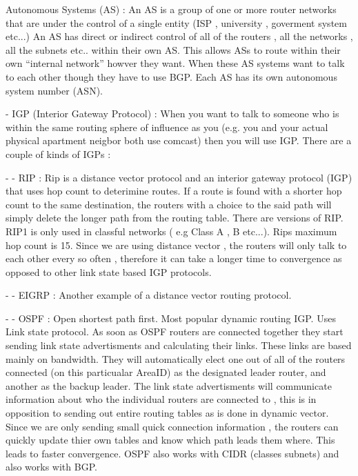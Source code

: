 Autonomous Systems (AS) : An AS is a group of one or more router networks that
are under the control of a single entity (ISP , university , goverment system
etc...) An AS has direct or indirect control of all of the routers , all the
networks , all the subnets etc.. within their own AS. This allows ASs to route
within their own ``internal network'' howver they want.  When these AS systems
want to talk to each other though they have to use BGP. Each AS has its own
autonomous system number (ASN).

 - IGP (Interior Gateway Protocol) : When you want to talk to someone who is
 within the same routing sphere of influence as you (e.g. you and your actual
 physical apartment neigbor both use comcast) then you will use IGP. There are a
 couple of kinds of IGPs :
 
  - - RIP : Rip is a distance vector protocol and an interior gateway protocol
  (IGP)  that uses hop count to deterimine routes. If a route is found with a
  shorter hop count to the same destination, the routers with a choice to the
  said path will simply delete the longer path from the routing table. There are
  versions of RIP.  RIP1 is only used in classful networks ( e.g Class A , B
  etc...). Rips maximum hop count is 15. Since we are using distance vector ,
  the routers will only talk to each other every so often , therefore it can
  take a longer time to convergence as opposed to other link state based IGP
  protocols.

  - - EIGRP : Another example of a distance vector routing protocol.

  - - OSPF : Open shortest path first. Most popular dynamic routing IGP. Uses
  Link state protocol. As soon as OSPF routers are connected together they start
  sending link state advertisments and calculating their links. These links are
  based mainly on bandwidth. They will automatically elect one out of all of the
  routers connected (on this particualar AreaID) as the designated leader
  router, and another as the backup leader. The link state advertisments will
  communicate information about who the individual routers are connected to ,
  this is in opposition to sending out entire routing tables as is done in
  dynamic vector. Since we are only sending small quick connection information ,
  the routers can quickly update thier own tables and know which path leads them
  where. This leads to faster convergence. OSPF also works with CIDR (classes
  subnets) and also works with BGP.


\subsubsectionend

